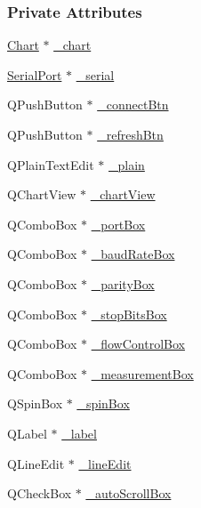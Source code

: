 \subsubsection*{Private Attributes}
\begin{DoxyCompactItemize}
\item 
\hyperlink{classChart}{Chart} $\ast$ \hyperlink{classMainWindow_abceb3cc9b41fa17bf367f7cb475a0a03}{\+\_\+chart}
\item 
\hyperlink{classSerialPort}{Serial\+Port} $\ast$ \hyperlink{classMainWindow_a19f91aa8908f303c76ce28b091f97e73}{\+\_\+serial}
\item 
Q\+Push\+Button $\ast$ \hyperlink{classMainWindow_a8a24c0fa7a9ce08d7c62043cb90c1a84}{\+\_\+connect\+Btn}
\item 
Q\+Push\+Button $\ast$ \hyperlink{classMainWindow_a8de7f487a7dfb1d7e7d15e3a1366fa15}{\+\_\+refresh\+Btn}
\item 
Q\+Plain\+Text\+Edit $\ast$ \hyperlink{classMainWindow_aad53a19d55400715e21a8c4a94cd6754}{\+\_\+plain}
\item 
Q\+Chart\+View $\ast$ \hyperlink{classMainWindow_a5c1071e1a9b436f607e14dd85cc51c6f}{\+\_\+chart\+View}
\item 
Q\+Combo\+Box $\ast$ \hyperlink{classMainWindow_a4412056949abeb7a14a44491be5fc9ea}{\+\_\+port\+Box}
\item 
Q\+Combo\+Box $\ast$ \hyperlink{classMainWindow_aff8ced34c2938264052e888fa31c9704}{\+\_\+baud\+Rate\+Box}
\item 
Q\+Combo\+Box $\ast$ \hyperlink{classMainWindow_ae6041d00d855eaa9f8a03297c556465a}{\+\_\+parity\+Box}
\item 
Q\+Combo\+Box $\ast$ \hyperlink{classMainWindow_ad886195377aedece39671edd11ed5d39}{\+\_\+stop\+Bits\+Box}
\item 
Q\+Combo\+Box $\ast$ \hyperlink{classMainWindow_ac4ca89e6458dbce1f4dca70f17123892}{\+\_\+flow\+Control\+Box}
\item 
Q\+Combo\+Box $\ast$ \hyperlink{classMainWindow_a9ebbfaef63c626558fd9ecca791493a6}{\+\_\+measurement\+Box}
\item 
Q\+Spin\+Box $\ast$ \hyperlink{classMainWindow_ab5c9c33a5b95515303a7aabdf05e70b1}{\+\_\+spin\+Box}
\item 
Q\+Label $\ast$ \hyperlink{classMainWindow_a1b4b4e9cd06c11051d9d88c17334b57e}{\+\_\+label}
\item 
Q\+Line\+Edit $\ast$ \hyperlink{classMainWindow_ad8d180d000764830c6600213928fa38d}{\+\_\+line\+Edit}
\item 
Q\+Check\+Box $\ast$ \hyperlink{classMainWindow_aacb799cbf321719bbb1d682302798252}{\+\_\+auto\+Scroll\+Box}
\end{DoxyCompactItemize}


